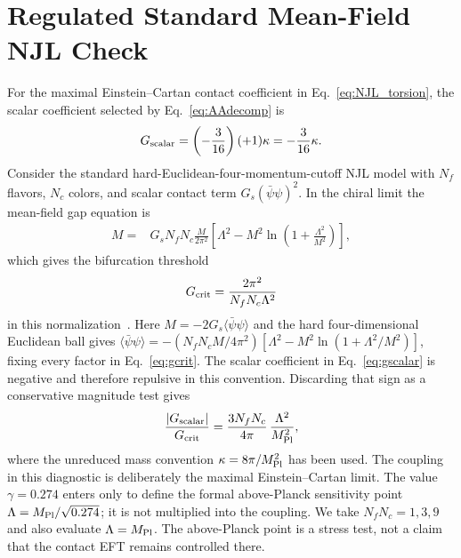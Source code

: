 \documentclass[aps,prd,twocolumn,superscriptaddress,showpacs,preprintnumbers,nofootinbib,longbibliography,floatfix]{revtex4-2}
\begin{document}
\section{Regulated Standard Mean-Field NJL Check}\label{app:njl_gap}

For the maximal Einstein--Cartan contact coefficient in
Eq.~\eqref{eq:NJL_torsion}, the scalar coefficient selected by
Eq.~\eqref{eq:AAdecomp} is
\begin{equation}\label{eq:gscalar}
G_{\rm scalar}=\left(-\frac{3}{16}\right)(+1)\kappa
=-\frac{3}{16}\kappa.
\end{equation}
Consider the standard hard-Euclidean-four-momentum-cutoff NJL model with
$N_f$ flavors, $N_c$ colors, and scalar contact term
$G_s(\bar\psi\psi)^2$.  In the chiral limit the mean-field gap equation is
\begin{align}
M={}&G_sN_fN_c\frac{M}{2\pi^2}
\left[\Lambda^2-M^2\ln\!\left(1+\frac{\Lambda^2}{M^2}\right)\right],
\end{align}
which gives the bifurcation threshold
\begin{equation}\label{eq:gcrit}
G_{\rm crit}=\frac{2\pi^2}{N_fN_c\Lambda^2}
\end{equation}
in this normalization~\cite{Klevansky1992,HatsudaKunihiro1994,Buballa2005}.
Here $M=-2G_s\langle\bar\psi\psi\rangle$ and the hard four-dimensional
Euclidean ball gives
$\langle\bar\psi\psi\rangle=-(N_fN_cM/4\pi^2)
[\Lambda^2-M^2\ln(1+\Lambda^2/M^2)]$, fixing every factor in
Eq.~\eqref{eq:gcrit}.
The scalar coefficient in Eq.~\eqref{eq:gscalar} is negative and therefore
repulsive in this convention.  Discarding that sign as a conservative
magnitude test gives
\begin{equation}\label{eq:ratio}
\frac{|G_{\rm scalar}|}{G_{\rm crit}}
=\frac{3N_fN_c}{4\pi}\,\frac{\Lambda^2}{M_{\rm Pl}^2},
\end{equation}
where the unreduced mass convention $\kappa=8\pi/M_{\rm Pl}^2$ has been used.
The coupling in this diagnostic is deliberately the maximal
Einstein--Cartan limit.  The value $\gamma=0.274$ enters only to define the
formal above-Planck sensitivity point $\Lambda=M_{\rm Pl}/\sqrt{0.274}$; it is
not multiplied into the coupling.  We take $N_fN_c=1,3,9$ and also evaluate
$\Lambda=M_{\rm Pl}$.  The above-Planck point is a stress test, not a claim that
the contact EFT remains controlled there.
\end{document}
